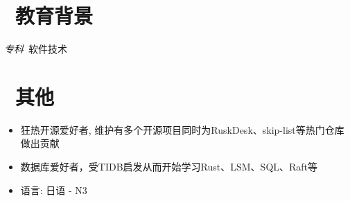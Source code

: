 \documentclass{resume}
\begin{document}
\section{\faGraduationCap\  教育背景}
\textit{专科}\ 软件技术

\section{\faInfo\ 其他}
\begin{itemize}[parsep=0.5ex]
  \item 狂热开源爱好者, 维护有多个开源项目同时为RuskDesk、skip-list等热门仓库做出贡献
  \item 数据库爱好者，受TIDB启发从而开始学习Rust、LSM、SQL、Raft等
  \item 语言: 日语 - N3
\end{itemize}

%
%
\end{document}
